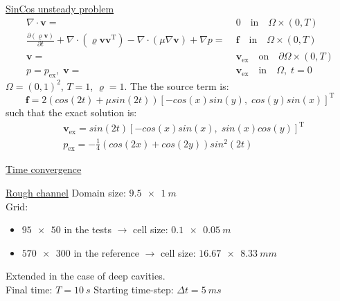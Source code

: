 \documentclass{beamer}
\begin{document}
\begin{frame}[label=timeconvSupp]{\hyperlink{timeconv}{SinCos unsteady problem}}
\begin{align*}
\nabla \cdot \mathbf{v} =& \; 0 \quad \text{in} \quad \Omega \times (0,T)\\
\frac{\partial (\varrho \mathbf{v})}{\partial t} + \nabla \cdot (\varrho 
\mathbf{v} \mathbf{v^\mathrm{T}}) - \nabla \cdot (\mu 
\nabla \mathbf{v}) + \nabla p =& \; \mathbf{f} \quad \text{in} \quad \Omega 
\times (0,T)\\
\mathbf{v} =& \; \mathbf{v}_\text{ex} \quad \text{on} \quad \partial \Omega 
\times (0,T)
\\p=p_\text{ex},\;\mathbf{v} =&\; \mathbf{v}_\text{ex} \quad \text{in} \quad 
\Omega, \; t=0
\end{align*}
$\Omega = (0,1)^2$, $T=1$, $\varrho = 1$. The the source term is:
\begin{equation*}
\mathbf{f} = 2(cos(2t)+\mu sin(2t))[-cos(x) sin(y), \; cos(y) sin(x)]^\mathrm{T}
\end{equation*}
such that the exact solution is:
\begin{align*}
&\mathbf{v}_\text{ex} = sin(2t)[-cos(x) sin(x), \; sin(x) cos(y)]^\mathrm{T}\\
&p_\text{ex} = -\frac{1}{4} (cos(2x)+cos(2y))sin^2(2t)
\end{align*}
\end{frame}
\begin{frame}{\hyperlink{timeconv}{Time convergence}}
\vspace{-0.8cm}
	\begin{figure}
		\centering
		\subfloat[Pressure]{\hspace{-1cm}}
		\subfloat[Velocity]{}
	\end{figure}
\end{frame}
\begin{frame}[label=roughSupp]{\hyperlink{rough}{Rough channel}}
Domain size: $\SI{9.5x1}{m}$\\[\baselineskip]
Grid:
\begin{itemize}
	\item $\num{95x50}$ in the tests $\rightarrow$ cell size: 
	$\SI{0.1x0.05}{m}$
	\item $\num{570x300}$ in the reference $\rightarrow$ cell size: 
	$\SI{16.67x8.33}{mm}$
\end{itemize}
Extended in the case of deep cavities.\\[\baselineskip]
Final time: $T=\SI{10}{s}$
Starting time-step: $\Delta t=\SI{5}{ms}$
\end{frame}
\end{document}
